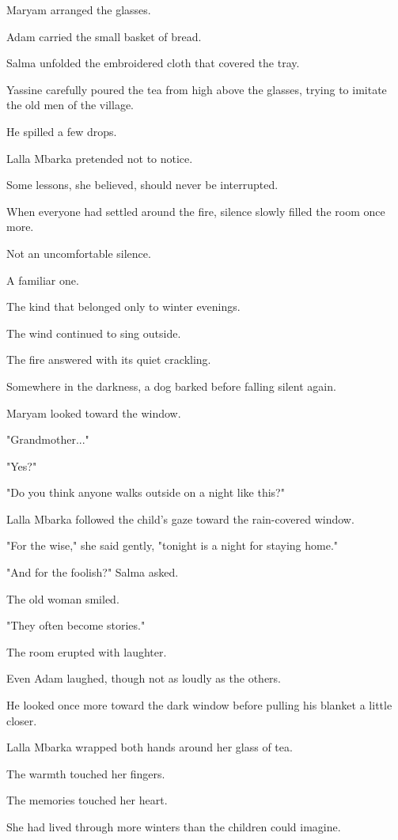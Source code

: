 \documentclass[12pt,openany]{book}
\begin{document}
Maryam arranged the glasses.

Adam carried the small basket of bread.

Salma unfolded the embroidered cloth that covered the tray.

Yassine carefully poured the tea from high above the glasses, trying to imitate the old men of the village.

He spilled a few drops.

Lalla Mbarka pretended not to notice.

Some lessons, she believed, should never be interrupted.

When everyone had settled around the fire, silence slowly filled the room once more.

Not an uncomfortable silence.

A familiar one.

The kind that belonged only to winter evenings.

The wind continued to sing outside.

The fire answered with its quiet crackling.

Somewhere in the darkness, a dog barked before falling silent again.

Maryam looked toward the window.

"Grandmother..."

"Yes?"

"Do you think anyone walks outside on a night like this?"

Lalla Mbarka followed the child's gaze toward the rain-covered window.

"For the wise," she said gently, "tonight is a night for staying home."

"And for the foolish?" Salma asked.

The old woman smiled.

"They often become stories."

The room erupted with laughter.

Even Adam laughed, though not as loudly as the others.

He looked once more toward the dark window before pulling his blanket a little closer.

Lalla Mbarka wrapped both hands around her glass of tea.

The warmth touched her fingers.

The memories touched her heart.

She had lived through more winters than the children could imagine.
\end{document}
